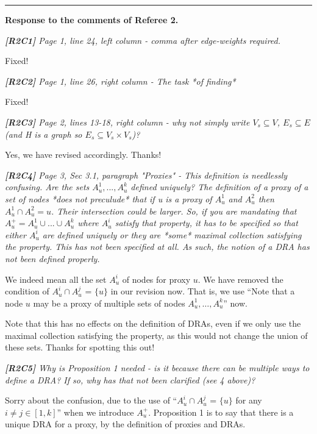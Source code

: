 \documentclass[11pt]{letter}
\newcommand{\vs}{\vspace{1ex}}
\newcommand{\svs}{\vspace{0.36ex}}
\begin{document}
\vspace{2.8ex}
\hrule
\vspace{0.6ex}
{\bf Response to the comments of Referee 2.}



\vs
\noindent
{\em
{\bf [R2C1]}
 Page 1, line 24, left column - comma after edge-weights required.}
\svs

Fixed!

\vs
\noindent
{\em
{\bf [R2C2]} Page 1, line 26, right column - The task *of finding*}
\svs

Fixed!

\vs
\noindent
{\em
{\bf [R2C3]} Page 2, lines 13-18, right column - why not simply write $V_s \subseteq V$, $E_s \subseteq E$ (and H is a graph so $E_s \subseteq V_s \times V_s$)?
}
\svs

Yes, we have revised accordingly. Thanks!


\vs
\noindent
{\em{\bf[R2C4]} Page 3, Sec 3.1, paragraph "Proxies" - This definition is needlessly confusing. Are the sets $A_u^1, ..., A_u^k$ defined uniquely? The definition of a proxy of a set of nodes *does not preculude* that
if u is a proxy of $A_u^1$ and $A_u^2$ then $A_u^1 \cap A_u^2 = {u}$.
Their intersection could be larger. So, if you are mandating that
$A_u^+ = A_u^1 \cup ... \cup A_u^k$ where $A_u^i$ satisfy that property,
it has to be specified so that either $A_u^i$ are defined uniquely or
they are *some* maximal collection satisfying the property. This
has not been specified at all. As such, the notion of a DRA has
not been defined properly.}
\svs

We indeed mean all the set $A_u^i$ of nodes for proxy $u$. We have removed the condition of $A^i_u\cap A^j_u$ = $\{u\}$ in our revision now.
%
That is, we use ``Note that a node $u$ may be a proxy of multiple sets of nodes $A^1_u, \ldots, A^k_u$'' now.

Note that this has no effects on the definition of DRAs, even if we only use the maximal collection satisfying the property, as this would not change the union of these sets. Thanks for spotting this out!

\vs
\noindent
{\em{\bf[R2C5]} Why is Proposition 1 needed - is it because there can be multiple ways to define a DRA? If so, why has that not been clarified (see 4 above)?}
\svs

Sorry about the confusion, due to the use of ``$A^i_u\cap A^j_u$ = $\{u\}$ for any $i\ne j\in[1, k]$'' when we introduce $A_u^+$.
 Proposition 1 is to say that there is a unique DRA for a proxy, by the definition of proxies and DRAs.
\end{document}
